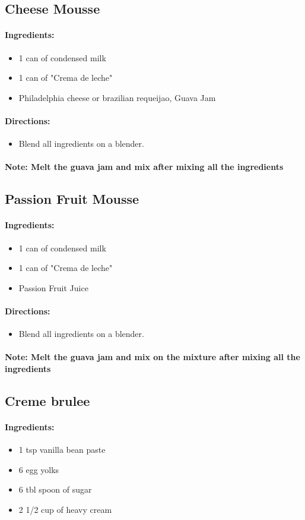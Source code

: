 \documentclass{article}
\begin{document}
\newcommand{\mousse}[3]{
\subsection{#1 Mousse}

\paragraph{Ingredients:}

\begin{itemize}
	\item 1 can of condensed milk
	\item 1 can of "Crema de leche"
	\item #2
\end{itemize}

\paragraph{Directions:}
\begin{itemize}
	\item Blend all ingredients on a blender.
\end{itemize}

\paragraph{Note: #3}
}

\mousse{Cheese}{Philadelphia cheese or brazilian requeijao, Guava Jam}{Melt the guava jam and mix after mixing all the ingredients}

\mousse{Passion Fruit}{Passion Fruit Juice}{Melt the guava jam and mix on the mixture after mixing all the ingredients}

\subsection{Creme brulee}

\paragraph{Ingredients:}

\begin{itemize}
\item 1 tsp vanilla bean paste
\item 6 egg yolks
\item 6 tbl spoon of sugar
\item 2 1/2 cup of heavy cream
\end{itemize}
\end{document}
